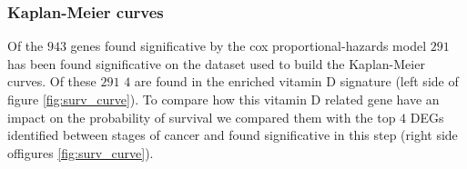 \documentclass[fleqn,10pt]{SelfArx} %
\begin{document}
		\subsubsection{Kaplan-Meier curves}
			Of the $943$ genes found significative by the cox proportional-hazards model $291$ has been found significative on the dataset used to build the Kaplan-Meier curves.
			Of these $291$ $4$ are found in the enriched vitamin D signature (left side of figure \ref{fig:surv_curve}).
			To compare how this vitamin D related gene have an impact on the probability of survival we compared them with the top $4$ DEGs identified between stages of cancer and found significative in this step (right side offigures \ref{fig:surv_curve}).

			 \begin{figure}[ht]\centering
				 \begin{multicols}{2}


\end{multicols}
\end{figure}
\end{document}
